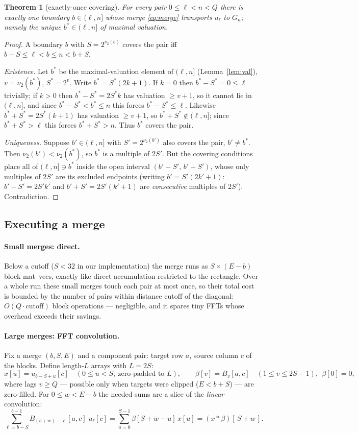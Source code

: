 \documentclass[11pt]{article}
\newtheorem{theorem}{Theorem}
\newcommand{\vtwo}{\nu_2}
\begin{document}
\begin{theorem}[exactly-once covering]
\label{thm:cover}
For every pair $0\le\ell<n<Q$ there is exactly one boundary
$b\in(\ell,n]$ whose merge \eqref{eq:merge} transports $u_\ell$ to
$G_n$; namely the unique $b^*\in(\ell,n]$ of maximal valuation.
\end{theorem}
\begin{proof}
A boundary $b$ with $S=2^{\vtwo(b)}$ covers the pair iff
$b-S\le\ell<b\le n<b+S$.

\emph{Existence.} Let $b^*$ be the maximal-valuation element of
$(\ell,n]$ (Lemma~\ref{lem:val}), $v=\vtwo(b^*)$, $S^*=2^{v}$. Write
$b^*=S^*(2k+1)$. If $k=0$ then $b^*-S^*=0\le\ell$ trivially; if $k>0$
then $b^*-S^* = 2S^*k$ has valuation $\ge v+1$, so it cannot lie in
$(\ell,n]$, and since $b^*-S^*<b^*\le n$ this forces
$b^*-S^*\le\ell$. Likewise $b^*+S^*=2S^*(k+1)$ has valuation $\ge v+1$,
so $b^*+S^*\notin(\ell,n]$; since $b^*+S^*>\ell$ this forces
$b^*+S^*>n$. Thus $b^*$ covers the pair.

\emph{Uniqueness.} Suppose $b'\in(\ell,n]$ with $S'=2^{\vtwo(b')}$ also
covers the pair, $b'\ne b^*$. Then $\vtwo(b')<\vtwo(b^*)$, so $b^*$ is
a multiple of $2S'$. But the covering conditions place all of
$(\ell,n]\ni b^*$ inside the open interval $(b'-S',\,b'+S')$, whose
only multiples of $2S'$ are its excluded endpoints (writing
$b'=S'(2k'+1)$: $b'-S'=2S'k'$ and $b'+S'=2S'(k'+1)$ are
\emph{consecutive} multiples of $2S'$). Contradiction.
\end{proof}

\subsection{Executing a merge}
\label{sec:execute}

\paragraph{Small merges: direct.} Below a cutoff ($S<32$ in our
implementation) the merge runs as $S\times(E-b)$ block mat--vecs,
exactly like direct accumulation restricted to the rectangle. Over a
whole run these small merges touch each pair at most once, so their
total cost is bounded by the number of pairs within distance
$\mathrm{cutoff}$ of the diagonal: $O(Q\cdot\mathrm{cutoff})$ block
operations --- negligible, and it spares tiny FFTs whose overhead
exceeds their savings.

\paragraph{Large merges: FFT convolution.} Fix a merge $(b,S,E)$ and a
component pair: target row $a$, source column $c$ of the blocks. Define
length-$L$ arrays with $L=2S$:
\[
x[u] = u_{b-S+u}[c]\quad (0\le u<S,\ \text{zero-padded to } L),
\qquad
\beta[v] = B_v[a,c]\quad (1\le v\le 2S-1),\ \ \beta[0]=0,
\]
where lags $v\ge Q$ --- possible only when targets were clipped
($E<b+S$) --- are zero-filled. For $0\le w<E-b$ the needed sums are a
slice of the \emph{linear} convolution:
\[
\sum_{\ell=b-S}^{b-1} B_{(b+w)-\ell}[a,c]\;u_\ell[c]
= \sum_{u=0}^{S-1}\beta[S+w-u]\,x[u]
= (x*\beta)[\,S+w\,].
\]
\end{document}
